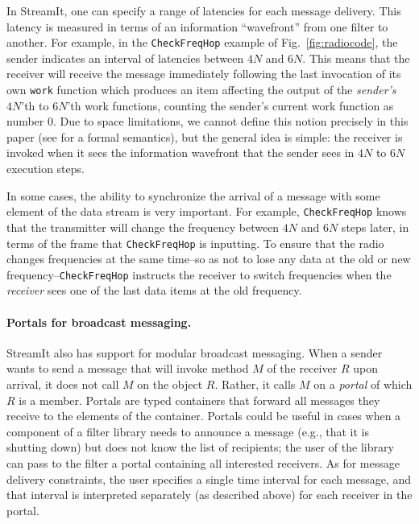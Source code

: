 In StreamIt, one can specify a range of latencies for each message
delivery.  This latency is measured in terms of an information
``wavefront'' from one filter to another.  For example, in the
\texttt{CheckFreqHop} example of Fig.~\ref{fig:radiocode}, the
sender indicates an interval of latencies between $4N$ and $6N$.  This
means that the receiver will receive the message immediately following
the last invocation of its own \texttt{work} function which produces
an item affecting the output of the \emph{sender's} $4N$'th to $6N$'th
work functions, counting the sender's current work function as number
0.  Due to space limitations, we cannot define this notion precisely
in this paper (see \cite{streamittech620,streamittech622} for a formal
semantics), but the general idea is simple: the receiver is invoked
when it sees the information wavefront that the sender sees in $4N$ to
$6N$ execution steps.

In some cases, the ability to synchronize the arrival of a message
with some element of the data stream is very important.  For example,
\texttt{CheckFreqHop} knows that the transmitter will change the
frequency between $4N$ and $6N$ steps later, in terms of the frame
that \texttt{CheckFreqHop} is inputting.  To ensure that the radio
changes frequencies at the same time--so as not to lose any data at
the old or new frequency--\texttt{CheckFreqHop} instructs the receiver to
switch frequencies when the \emph{receiver} sees one of the last data
items at the old frequency.

%
\paragraph{Portals for broadcast messaging.}  StreamIt also has support for
modular broadcast messaging.  When a sender wants to send a message
that will invoke method $M$ of the receiver $R$ upon arrival, it does
not call $M$ on the object $R$.  Rather, it calls $M$ on a
\emph{portal} of which $R$ is a member.  Portals are typed containers
that forward all messages they receive to the elements of the
container.  Portals could be useful in cases when a component of a
filter library needs to announce a message (e.g., that it is shutting
down) but does not know the list of recipients; the user of the
library can pass to the filter a portal containing all interested
receivers.  As for message delivery constraints, the user specifies a
single time interval for each message, and that interval is
interpreted separately (as described above) for each receiver in the
portal.

